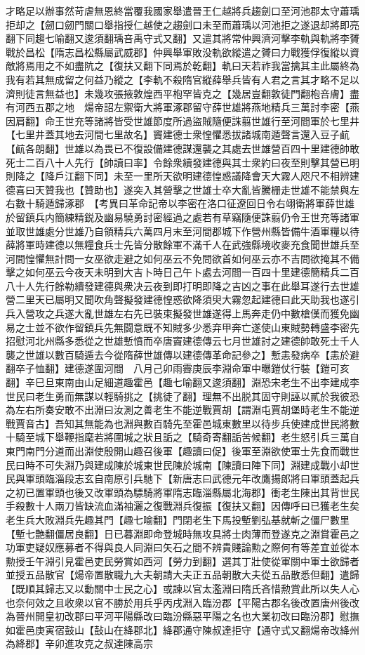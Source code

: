 才略足以辦事然苛虐無恩終當覆我國家舉遣晉王仁越將兵趨劍口至河池郡太守蕭瑀拒却之【劒口劒門關口舉指授仁越使之趨劍口未至而蕭瑀以河池拒之遂退却將即亮翻下同趨七喻翻又逡須翻瑀咅禹守式又翻】又遣其將常仲興濟河擊李軌與軌將李贇戰於昌松【隋志昌松縣屬武威郡】仲興舉軍敗没軌欲縱遣之贇曰力戰獲俘復縱以資敵將焉用之不如盡阬之【復扶又翻下同焉於乾翻】軌曰天若祚我當擒其主此屬終為我有若其無成留之何益乃縱之【李軌不殺隋官縱薛舉兵皆有人君之言其才略不足以濟則徒言無益也】未幾攻張掖敦煌西平枹罕皆克之【幾居豈翻敦徒門翻枹咅膚】盡有河西五郡之地　煬帝詔左禦衛大將軍涿郡留守薛世雄將燕地精兵三萬討李密【燕因肩翻】命王世充等諸將皆受世雄節度所過盜賊隨便誅翦世雄行至河間軍於七里井【七里井蓋其地去河間七里故名】竇建德士衆惶懼悉拔諸城南遁聲言還入豆子䴚【䴚各朗翻】世雄以為畏已不復設備建德謀還襲之其處去世雄營百四十里建德帥敢死士二百八十人先行【帥讀曰率】令餘衆續發建德與其士衆約曰夜至則擊其營已明則降之【降戶江翻下同】未至一里所天欲明建德惶惑議降會天大霧人咫尺不相辨建德喜曰天贊我也【贊助也】遂突入其營擊之世雄士卒大亂皆騰栅走世雄不能禁與左右數十騎遁歸涿郡　【考異曰革命記帝以李密在洛口征遼回日令右翊衛將軍薛世雄於留鎮兵内簡練精鋭及幽易驍勇討密經過之處若有草竊隨便誅翦仍令王世充等諸軍並取世雄處分世雄乃自領精兵六萬四月末至河間郡城下作營州縣皆備牛酒軍糧以待薛將軍時建德以無糧食兵士先皆分散餘軍不滿千人在武強縣境收麥充食聞世雄兵至河間惶懼無計問一女巫欲走避之如何巫云不免問欲首如何巫云亦不吉問欲掩其不備擊之如何巫云今夜天未明到大吉卜時日己午卜處去河間一百四十里建德簡精兵二百八十人先行餘勒續發建德與衆决云夜到即打明即降之吉凶之事在此舉耳遂行去世雄營二里天已屬明又聞吹角聲擬發建德惶惑欲降須臾大霧忽起建德曰此天助我也遂引兵入營攻之兵遂大亂世雄左右先已裝束擬發世雄遂得上馬奔走仍中數槍傼而獲免幽易之士並不欲作留鎮兵先無闘意既不知賊多少悉弃甲奔亡遂使山東賊勢轉盛李密先招慰河北州縣多悉從之世雄慙憤而卒唐竇建德傳云七月世雄討之建德帥敢死士千人襲之世雄以數百騎遁去今從隋薛世雄傳以建德傳革命記參之】慙恚發病卒【恚於避翻卒子恤翻】建德遂圍河間　八月己卯雨霽庚辰李淵命軍中曝鎧仗行裝【鎧可亥翻】辛巳旦東南由山足細道趣霍邑【趣七喻翻又逡須翻】淵恐宋老生不出李建成李世民曰老生勇而無謀以輕騎挑之【挑徒了翻】理無不出脱其固守則誣以貳於我彼恐為左右所奏安敢不出淵曰汝測之善老生不能逆戰賈胡【謂淵屯賈胡堡時老生不能逆戰賈音古】吾知其無能為也淵與數百騎先至霍邑城東數里以待步兵使建成世民將數十騎至城下舉鞭指麾若將圍城之狀且詬之【騎奇寄翻詬苦候翻】老生怒引兵三萬自東門南門分道而出淵使殷開山趣召後軍【趣讀曰促】後軍至淵欲使軍士先食而戰世民曰時不可失淵乃與建成陳於城東世民陳於城南【陳讀曰陣下同】淵建成戰小却世民與軍頭臨淄段志玄自南原引兵馳下【新唐志曰武德元年改鷹揚郎將曰軍頭蓋起兵之初已置軍頭也後又改軍頭為驃騎將軍隋志臨淄縣屬北海郡】衝老生陳出其背世民手殺數十人兩刀皆缺流血滿袖灑之復戰淵兵復振【復扶又翻】因傳呼曰已獲老生矣老生兵大敗淵兵先趣其門【趣七喻翻】門閉老生下馬投塹劉弘基就斬之僵尸數里【塹七艶翻僵居良翻】日已暮淵即命登城時無攻具將士肉薄而登遂克之淵賞霍邑之功軍吏疑奴應募者不得與良人同淵曰矢石之間不辨貴賤論勲之際何有等差宜並從本勲授壬午淵引見霍邑吏民勞賞如西河【勞力到翻】選其丁壯使從軍關中軍士欲歸者並授五品散官【煬帝置散職九大夫朝請大夫正五品朝散大夫從五品散悉但翻】遣歸【既順其歸志又以動關中士民之心】或諫以官太濫淵曰隋氏吝惜勲賞此所以失人心也奈何效之且收衆以官不勝於用兵乎丙戌淵入臨汾郡【平陽古郡名後改置唐州後改為晉州開皇初改郡曰平河平陽縣改曰臨汾縣惡平陽之名也大業初改曰臨汾郡】慰撫如霍邑庚寅宿鼓山【鼔山在絳郡北】絳郡通守陳叔達拒守【通守式又翻煬帝改絳州為絳郡】辛卯進攻克之叔達陳高宗